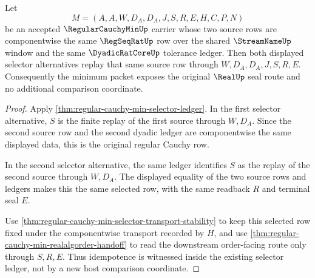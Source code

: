 \begin{theorem}
\label{thm:regular-cauchy-min-selector-idempotence}
Let
$$
M=(A,A,W,D_A,D_A,J,S,R,E,H,C,P,N)
$$
be an accepted $\RegularCauchyMinUp$ carrier whose two source rows are componentwise the same $\RegSeqRatUp$ row over the shared $\StreamNameUp$ window and the same $\DyadicRatCoreUp$ tolerance ledger. Then both displayed selector alternatives replay that same source row through $W,D_A,D_A,J,S,R,E$. Consequently the minimum packet exposes the original $\RealUp$ seal route and no additional comparison coordinate.
\end{theorem}
\begin{proof}
Apply \autoref{thm:regular-cauchy-min-selector-ledger}. In the first selector alternative, $S$ is the finite replay of the first source through $W,D_A$. Since the second source row and the second dyadic ledger are componentwise the same displayed data, this is the original regular Cauchy row.

In the second selector alternative, the same ledger identifies $S$ as the replay of the second source through $W,D_A$. The displayed equality of the two source rows and ledgers makes this the same selected row, with the same readback $R$ and terminal seal $E$.

Use \autoref{thm:regular-cauchy-min-selector-transport-stability} to keep this selected row fixed under the componentwise transport recorded by $H$, and use \autoref{thm:regular-cauchy-min-realalgorder-handoff} to read the downstream order-facing route only through $S,R,E$. Thus idempotence is witnessed inside the existing selector ledger, not by a new host comparison coordinate.
\end{proof}

